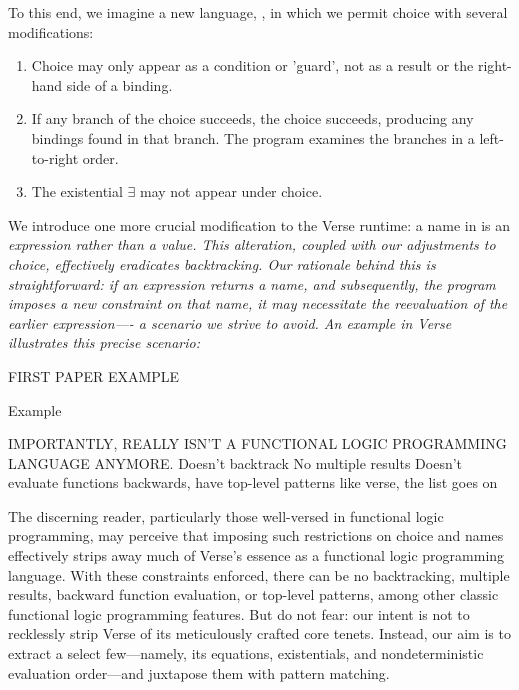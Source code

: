 \documentclass[manuscript,screen,review, 12pt]{acmart}
\begin{document}
\begin{outline}[enumerate]
        To this end, we imagine a new language, \VMinus, in which we permit
        choice with several modifications:

        \begin{enumerate}
        \item Choice may only appear as a condition or 'guard', not as a result
        or the right-hand side of a binding.
        \item If any branch of the choice succeeds, the choice succeeds,
        producing any bindings found in that branch. The program examines the
        branches in a left-to-right order.
        \item The existential $\exists$ may not appear under choice.
        \end{enumerate}

        We introduce one more crucial modification to the Verse runtime: a name
        in \VMinus is an \it{expression} rather than a \it{value}. This
        alteration, coupled with our adjustments to choice, effectively
         eradicates backtracking. Our rationale
        behind this is straightforward: if an expression returns a name, and
        subsequently, the program imposes a new constraint on that name, it may
        necessitate the reevaluation of the earlier expression—- a scenario we
        strive to avoid. An example in Verse illustrates this precise scenario:

        FIRST PAPER EXAMPLE 

        \2 Example 

        \2 IMPORTANTLY, \VMinus REALLY ISN'T A FUNCTIONAL LOGIC PROGRAMMING LANGUAGE ANYMORE. 
        \3 Doesn't backtrack
        \3 No multiple results 
        \3 Doesn't evaluate functions backwards, have top-level patterns like verse, the list goes on 


        The discerning reader, particularly those well-versed in functional
        logic programming, may perceive that imposing such restrictions on
        choice and names effectively strips away much of Verse's essence as a
        functional logic programming language. With these constraints enforced,
        there can be no backtracking, multiple results, backward function
        evaluation, or top-level patterns, among other classic functional logic
        programming features. But do not fear: our intent is not to recklessly
        strip Verse of its meticulously crafted core tenets. Instead, our aim is
        to extract a select few—namely, its equations, existentials, and
        nondeterministic evaluation order—and juxtapose them with pattern
        matching.


\end{outline}
\end{document}
